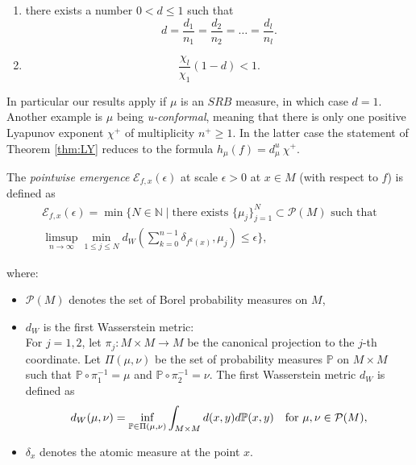 \documentclass{amsart}
\theoremstyle{plain}
\theoremstyle{definition}
\theoremstyle{remark}
\numberwithin{equation}{section}
\begin{document}
\begin{enumerate}
\item[\textbf{A1.}]  there exists a number $0 < d \leq 1$ such that    $$  d = \frac{d_1}{n_1} =   \frac{d_2}{n_2}  = \ldots  =  \frac{d_l}{n_l}.$$
\item[\textbf{A2.}] $$\frac{\chi_l}{\chi_1}(1-d)<1.$$ 
\end{enumerate}

In particular our results apply if $\mu$ is an $SRB$ measure, in which case $d=1$. Another example is  
 $\mu$ being \textit{u-conformal}, meaning that there is only one positive Lyapunov exponent $\chi^+$ of multiplicity $n^+\geq 1$.
In the latter case the statement of Theorem \ref{thm:LY} reduces to the formula
$h_{\mu}(f) =  d_{\mu}^u  ~ \chi^{+}$.

The \emph{pointwise emergence} $\mathscr E_{f,x}(\epsilon ) $  at scale $\epsilon >0$ at $x\in M$ (with respect to $f$) is defined as
\begin{multline}\label{eq:0403d}
\mathscr E_{f,x}(\epsilon ) = \min \Big\{ N \in \mathbb N \mid  \text{there exists   $\{ \mu _j\} _{j=1}^N \subset \mathcal P(M)$ such that} \\
\limsup _{n\to \infty}  \min _{1\leq j\leq N}  d_W \left( \sum_{k=0}^{n-1}\delta _{f^k(x)} , \mu _j \right) \leq \epsilon \Big \},
\end{multline}

where:
\begin{itemize}
\item $\mathcal P(M)$ denotes the set of Borel probability measures on $M$,
\item $d_W$ is the first Wasserstein metric:\\
For $j=1,2$, let $\pi_j :M\times M\to M $ be the canonical projection to the $j$-th coordinate. %
 Let $\Pi (\mu, \nu )$ be the set of probability measures $\mathbb{P}$ on $M\times M$ such that $\mathbb{P}\circ \pi_1^{-1} =\mu$ and $\mathbb{P}\circ \pi_2^{-1} =\nu$. 
 The first Wasserstein metric $d_W $ is defined as
 \[
d_W(\mu ,\nu )= \inf _{\mathbb{P} \in \Pi (\mu , \nu )} \int _{M\times M} d(x,y) d\mathbb{P} (x,y) \quad \text{for $ \mu  ,\nu \in \mathcal P(M)$} ,
 \]
\item $\delta_x$ denotes the atomic measure at the point $x$.
\end{itemize}
\end{document}
